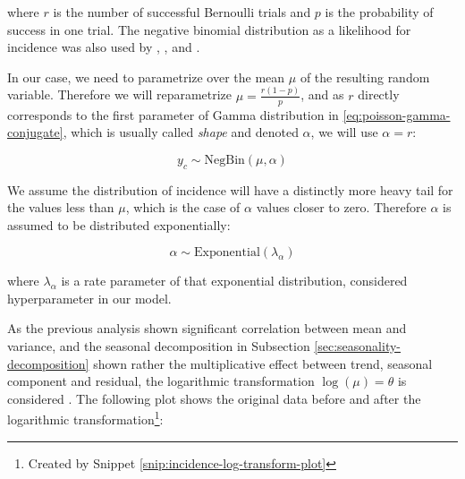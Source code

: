 \documentclass[
  digital, %
  oneside, %
  lof,     %
  lot,     %
]{fithesis4}
\begin{document}
\noindent
where $r$ is the number of successful Bernoulli trials and $p$ is the probability of success in one trial. The negative binomial distribution as a likelihood for incidence was also used by \cite{simone2020}, \cite{wallinga2004}, \cite{alzahrani2018} and \cite{manevski2020}.

In our case, we need to parametrize over the mean $\mu$ of the resulting random variable.
Therefore we will reparametrize $\mu = \frac{r(1 - p)}{p}$, and as $r$ directly corresponds to the first parameter of Gamma distribution in \eqref{eq:poisson-gamma-conjugate}, which is usually called \textit{shape} and denoted $\alpha$, we will use $\alpha = r$:

\begin{equation}\label{eq:neg-bin-distribution-reparametrized}
  y_c \sim \text{NegBin}\left( \mu, \alpha \right)
\end{equation}




We assume the distribution of incidence will have a distinctly more heavy tail for the values less than $\mu$, which is the case of $\alpha$ values closer to zero.
Therefore $\alpha$ is assumed to be distributed exponentially:

\begin{equation}\label{eq:alpha-prior}
	\alpha \sim \text{Exponential} \left( \lambda_{\alpha} \right)
\end{equation}

\noindent
where $\lambda_{\alpha}$ is a rate parameter of that exponential distribution, considered hyperparameter in our model.

As the previous analysis shown significant correlation between mean and variance, and the seasonal decomposition in Subsection \ref{sec:seasonality-decomposition} shown rather the multiplicative effect between trend, seasonal component and residual, the logarithmic transformation $\log \left( \mu \right) = \theta$ is considered \cite{cialdella2020}.
The following plot shows the original data before and after the logarithmic transformation\footnote{Created by Snippet \ref{snip:incidence-log-transform-plot}}:
\end{document}
